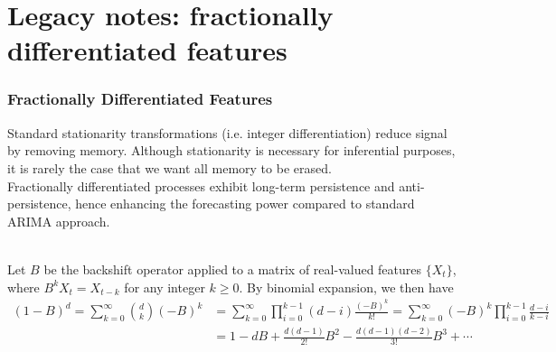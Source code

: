 \documentclass[a4paper,oneside,openany]{book}
\begin{document}
\chapter*{Legacy notes: fractionally differentiated features}

\subsection*{Fractionally Differentiated Features}

Standard stationarity transformations (i.e. integer differentiation) reduce signal by removing memory. Although stationarity is necessary for inferential purposes, it is rarely the case that we want all memory to be erased.\\
Fractionally differentiated processes exhibit long-term persistence and anti-persistence, hence enhancing the forecasting power compared to standard ARIMA approach.

\begin{definition} \\
Let $B$ be the backshift operator applied to a matrix of real-valued features $\{X_t \}$, where $B^k X_t = X_{t-k}$ for any integer $k \geq 0$. By binomial expansion, we then have
\begin{align*}
(1-B)^d = \sum\limits_{k=0}^{\infty} \binom{d}{k} (-B)^k &= \sum\limits_{k=0}^{\infty} \prod\limits_{i=0}^{k-1} (d-i) \frac{(-B)^k}{k!} = \sum\limits_{k=0}^{\infty} (-B)^k \prod\limits_{i=0}^{k-1} \frac{d-i}{k-i} \nonumber \\
&= 1 - dB + \frac{d(d-1)}{2!} B^2 - \frac{d(d-1)(d-2)}{3!} B^3 + \cdots \nonumber 
\end{align*}
\end{definition}
\end{document}
